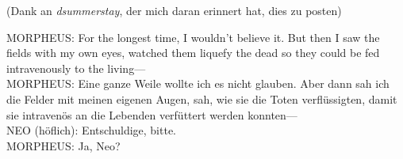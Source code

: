 {%
(Dank an \emph{dsummerstay}, der mich daran erinnert hat, dies zu posten)

\begin{playdialog}
MORPHEUS: For the longest time, I wouldn’t believe it. But then I saw the fields with my own eyes, watched them liquefy the dead so they could be fed intravenously to the living—\\
MORPHEUS: Eine ganze Weile wollte ich es nicht glauben. Aber dann sah ich die Felder mit meinen eigenen Augen, sah, wie sie die Toten verflüssigten, damit sie intravenös an die Lebenden verfüttert werden konnten—\\

NEO (höflich): Entschuldige, bitte.\\


MORPHEUS: Ja, Neo?\\



\end{playdialog}}
